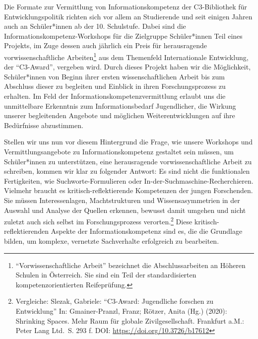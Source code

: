 \documentclass[a4paper,
fontsize=11pt,
oneside,
numbers=noperiodatend,
parskip=half-,
bibliography=totoc,
final
]{scrartcl}
\begin{document}
Die Formate zur Vermittlung von Informationskompetenz der C3-Bibliothek
für Entwicklungspolitik richten sich vor allem an Studierende und seit
einigen Jahren auch an Schüler*innen ab der 10. Schulstufe. Dabei sind
die Informationskompetenz-Workshops für die Zielgruppe Schüler*innen
Teil eines Projekts, im Zuge dessen auch jährlich ein Preis für
herausragende vorwissenschaftliche Arbeiten\footnote{\enquote{Vorwissenschaftliche
  Arbeit} bezeichnet die Abschlussarbeiten an Höheren Schulen in
  Österreich. Sie sind ein Teil der standardisierten
  kompetenzorientierten Reifeprüfung.} aus dem Themenfeld Internationale
Entwicklung, der \enquote{C3-Award}, vergeben wird. Durch dieses Projekt
haben wir die Möglichkeit, Schüler*innen von Beginn ihrer ersten
wissenschaftlichen Arbeit bis zum Abschluss dieser zu begleiten und
Einblick in ihren Forschungsprozess zu erhalten. Im Feld der
Informationskompetenzvermittlung erlaubt uns die unmittelbare Erkenntnis
zum Informationsbedarf Jugendlicher, die Wirkung unserer begleitenden
Angebote und möglichen Weiterentwicklungen auf ihre Bedürfnisse
abzustimmen.

Stellen wir uns nun vor diesem Hintergrund die Frage, wie unsere
Workshops und Vermittlungsangebote zu Informationskompetenz gestaltet
sein müssen, um Schüler*innen zu unterstützen, eine herausragende
vorwissenschaftliche Arbeit zu schreiben, kommen wir klar zu folgender
Antwort: Es sind nicht die funktionalen Fertigkeiten, wie
Suchworte-Formulieren oder In-der-Suchmaschine-Recherchieren. Vielmehr
braucht es kritisch-reflektierende Kompetenzen der jungen Forschenden.
Sie müssen Interessenlagen, Machtstrukturen und Wissensasymmetrien in
der Auswahl und Analyse der Quellen erkennen, bewusst damit umgehen und
nicht zuletzt auch sich selbst im Forschungsprozess verorten.\footnote{Vergleiche:
  Slezak, Gabriele: \enquote{C3-Award: Jugendliche forschen zu
  Entwicklung} In: Gmainer-Pranzl, Franz; Rötzer, Anita (Hg.) (2020):
  Shrinking Spaces. Mehr Raum für globale Zivilgesellschaft. Frankfurt
  a.M.: Peter Lang Ltd.~S. 293 f. DOI:
  \url{https://doi.org/10.3726/b17612}} Diese kritisch-reflektierenden
Aspekte der Informationskompetenz sind es, die die Grundlage bilden, um
komplexe, vernetzte Sachverhalte erfolgreich zu bearbeiten.
\end{document}
